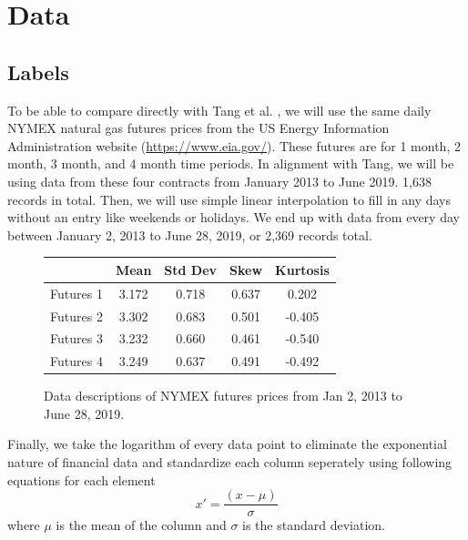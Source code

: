 \documentclass[final]{cvpr}
\begin{document}
\section{Data}

\subsection{Labels}

    To be able to compare directly with Tang et al. \cite{tang}, we will use the
    same daily NYMEX natural gas futures prices from the US Energy Information
    Administration website (\url{https://www.eia.gov/}). These futures are for 1
    month, 2 month, 3 month, and 4 month time periods. In alignment with Tang,
    we will be using data from these four contracts from January 2013 to June
    2019. 1,638 records in total. Then, we will use simple linear interpolation 
    to fill in any days without an entry like weekends or holidays. We end up 
    with data from every day between January 2, 2013 to June 28, 2019, or 2,369 
    records total.

    \begin{figure}[h]
        \caption{Data descriptions of NYMEX futures prices from Jan 2, 2013 to
            June 28, 2019.} 
        \center
        \begin{tabular}{| c || c | c | c | c |}
            \hline 
            & Mean & Std Dev & Skew & Kurtosis\\ 
            \hline
            \hline
            Futures 1 & 3.172 & 0.718 & 0.637 &  0.202\\
            Futures 2 & 3.302 & 0.683 & 0.501 & -0.405\\
            Futures 3 & 3.232 & 0.660 & 0.461 & -0.540\\
            Futures 4 & 3.249 & 0.637 & 0.491 & -0.492\\
            \hline
        \end{tabular}
    \end{figure}

    Finally, we take the logarithm of every data point to eliminate the
    exponential nature of financial data and standardize each column seperately
    using following equations for each element
    \begin{equation}
        x' = \frac{(x-\mu)}{\sigma}
    \end{equation}
    where $\mu$ is the mean of the column and $\sigma$ is the standard 
    deviation.
\end{document}
